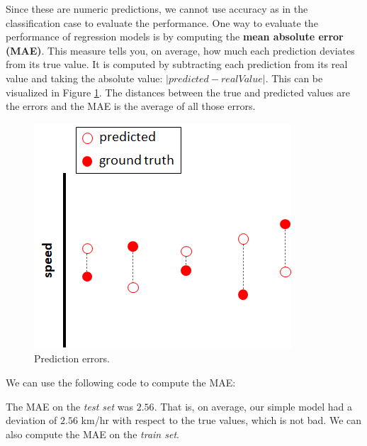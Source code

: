 \documentclass[
  11pt,
]{krantz}
\newenvironment{Shaded}{\begin{snugshade}}{\end{snugshade}}
\newcommand{\CommentTok}[1]{\textcolor[rgb]{0.37,0.37,0.37}{\textit{#1}}}
\newcommand{\FunctionTok}[1]{\textcolor[rgb]{0,0,0}{#1}}
\newcommand{\NormalTok}[1]{#1}
\newcommand{\OtherTok}[1]{\textcolor[rgb]{0.37,0.37,0.37}{#1}}
\newcommand{\SpecialCharTok}[1]{\textcolor[rgb]{0,0,0}{#1}}
\begin{document}
Since these are numeric predictions, we cannot use accuracy as in the classification case to evaluate the performance. One way to evaluate the performance of regression models is by computing the \textbf{mean absolute error (MAE)}. This measure tells you, on average, how much each prediction deviates from its true value. It is computed by subtracting each prediction from its real value and taking the absolute value: \(|predicted - realValue|\). This can be visualized in Figure \ref{fig:maeExample}. The distances between the true and predicted values are the errors and the MAE is the average of all those errors.

\begin{figure}

{\centering \includegraphics[width=0.4\linewidth]{images/mae} 

}

\caption{Prediction errors.}\label{fig:maeExample}
\end{figure}

We can use the following code to compute the MAE:

\begin{Shaded}
\end{Shaded}

The MAE on the \emph{test set} was \(2.56\). That is, on average, our simple model had a deviation of \(2.56\) km/hr with respect to the true values, which is not bad. We can also compute the MAE on the \emph{train set}.

\begin{Shaded}
\end{Shaded}
\end{document}
